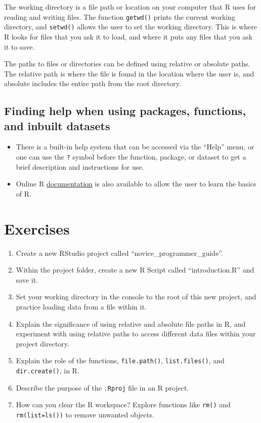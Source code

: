 \documentclass[
  letterpaper,
  DIV=11,
  numbers=noendperiod]{scrreprt}
\begin{document}
The working directory is a file path or location on your computer that R
uses for reading and writing files. The function \texttt{getwd()} prints
the current working directory, and \texttt{setwd()} allows the user to
set the working directory. This is where R looks for files that you ask
it to load, and where it puts any files that you ask it to save.

The paths to files or directories can be defined using relative or
absolute paths. The relative path is where the file is found in the
location where the user is, and absolute includes the entire path from
the root directory.

\subsection{Finding help when using packages, functions, and inbuilt
datasets}\label{finding-help-when-using-packages-functions-and-inbuilt-datasets}

\begin{itemize}
\item
  There is a built-in help system that can be accessed via the ``Help''
  menu, or one can use the \texttt{?} symbol before the function,
  package, or dataset to get a brief description and instructions for
  use.
\item
  Online R \href{https://cran.r-project.org/manuals.html}{documentation}
  is also available to allow the user to learn the basics of R.
\end{itemize}

\section{Exercises}\label{exercises-3}

\begin{enumerate}
\def\labelenumi{\roman{enumi}.}
\item
  Create a new RStudio project called ``novice\_programmer\_guide''.
\item
  Within the project folder, create a new R Script called
  ``introduction.R'' and save it.
\item
  Set your working directory in the console to the root of this new
  project, and practice loading data from a file within it.
\item
  Explain the significance of using relative and absolute file paths in
  R, and experiment with using relative paths to access different data
  files within your project directory.
\item
  Explain the role of the functions, \texttt{file.path()},
  \texttt{list.files()}, and \texttt{dir.create()}, in R.
\item
  Describe the purpose of the \texttt{.Rproj} file in an R project.
\item
  How can you clear the R workspace? Explore functions like
  \texttt{rm()} and \texttt{rm(list=ls())} to remove unwanted objects.
\end{enumerate}
\end{document}
